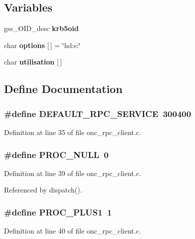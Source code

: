 \subsection*{Variables}
\begin{CompactItemize}
\item 
gss\_\-OID\_\-desc {\bf krb5oid}
\item 
char {\bf options} [$\,$] = \char`\"{}hd:s:\char`\"{}
\item 
char {\bf utilisation} [$\,$]
\end{CompactItemize}


\subsection{Define Documentation}
\subsubsection{\setlength{\rightskip}{0pt plus 5cm}\#define DEFAULT\_\-RPC\_\-SERVICE\ 300400}\label{onc__rpc__client_8c_a2}




Definition at line 35 of file onc\_\-rpc\_\-client.c.
\subsubsection{\setlength{\rightskip}{0pt plus 5cm}\#define PROC\_\-NULL\ 0}\label{onc__rpc__client_8c_a6}




Definition at line 39 of file onc\_\-rpc\_\-client.c.

Referenced by dispatch().
\subsubsection{\setlength{\rightskip}{0pt plus 5cm}\#define PROC\_\-PLUS1\ 1}\label{onc__rpc__client_8c_a7}




Definition at line 40 of file onc\_\-rpc\_\-client.c.

